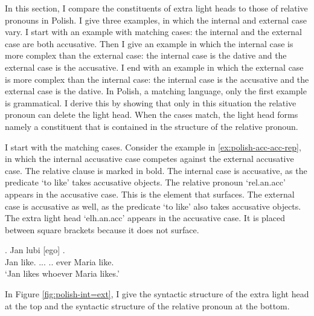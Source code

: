 In this section, I compare the constituents of extra light heads to those of relative pronouns in Polish. I give three examples, in which the internal and external case vary.
I start with an example with matching cases: the internal and the external case are both accusative.
Then I give an example in which the internal case is more complex than the external case: the internal case is the dative and the external case is the accusative.
I end with an example in which the external case is more complex than the internal case: the internal case is the accusative and the external case is the dative.
In Polish, a matching language, only the first example is grammatical. I derive this by showing that only in this situation the relative pronoun can delete the light head. When the cases match, the light head forms namely a constituent that is contained in the structure of the relative pronoun.

I start with the matching cases.
Consider the example in \ref{ex:polish-acc-acc-rep}, in which the internal accusative case competes against the external accusative case. The relative clause is marked in bold.
The internal case is accusative, as the predicate  `to like' takes accusative objects. The relative pronoun  `\ac{rel}.\ac{an}.\ac{acc}' appears in the accusative case. This is the element that surfaces.
The external case is accusative as well, as the predicate  `to like' also takes accusative objects. The extra light head  `\ac{elh}.\ac{an}.\ac{acc}' appears in the accusative case. It is placed between square brackets because it does not surface.

\exg. Jan lubi [ego]    .\\
 Jan like.\scsub{[acc]} ...  .. ever Maria like.\scsub{[acc]}\\
 `Jan likes whoever Maria likes.' \label{ex:polish-acc-acc-rep}

In Figure \ref{fig:polish-int=ext}, I give the syntactic structure of the extra light head at the top and the syntactic structure of the relative pronoun at the bottom.

